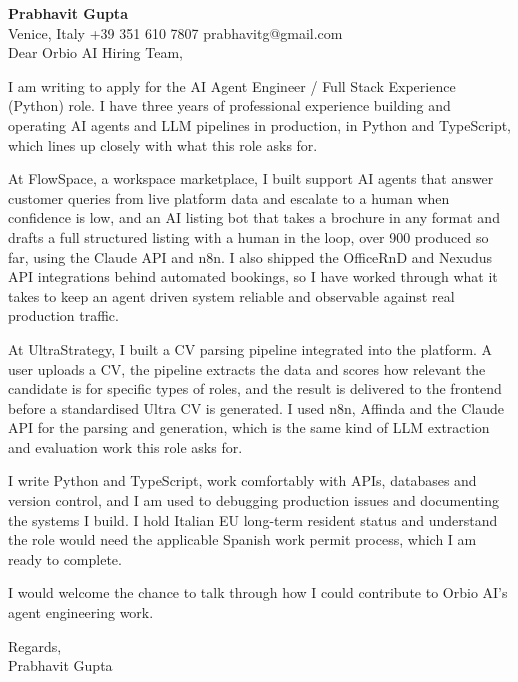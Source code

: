 \documentclass[a4paper,10.5pt]{article}
\begin{document}
\textbf{Prabhavit Gupta}\\
Venice, Italy \textbar{} +39 351 610 7807 \textbar{} prabhavitg@gmail.com\\[10pt]
Dear Orbio AI Hiring Team,

I am writing to apply for the AI Agent Engineer / Full Stack Experience (Python) role. I have three years of professional experience building and operating AI agents and LLM pipelines in production, in Python and TypeScript, which lines up closely with what this role asks for.

At FlowSpace, a workspace marketplace, I built support AI agents that answer customer queries from live platform data and escalate to a human when confidence is low, and an AI listing bot that takes a brochure in any format and drafts a full structured listing with a human in the loop, over 900 produced so far, using the Claude API and n8n. I also shipped the OfficeRnD and Nexudus API integrations behind automated bookings, so I have worked through what it takes to keep an agent driven system reliable and observable against real production traffic.

At UltraStrategy, I built a CV parsing pipeline integrated into the platform. A user uploads a CV, the pipeline extracts the data and scores how relevant the candidate is for specific types of roles, and the result is delivered to the frontend before a standardised Ultra CV is generated. I used n8n, Affinda and the Claude API for the parsing and generation, which is the same kind of LLM extraction and evaluation work this role asks for.

I write Python and TypeScript, work comfortably with APIs, databases and version control, and I am used to debugging production issues and documenting the systems I build. I hold Italian EU long-term resident status and understand the role would need the applicable Spanish work permit process, which I am ready to complete.

I would welcome the chance to talk through how I could contribute to Orbio AI's agent engineering work.

Regards,\\
Prabhavit Gupta
\end{document}

